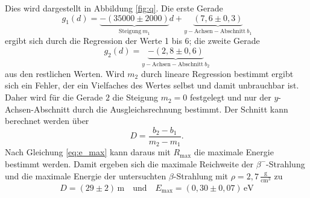 Dies wird dargestellt in Abbildung \ref{fig:q}.
Die erste Gerade
\begin{equation}
g_1(d)=\underbrace{-(35000\pm2000)}_{\text{Steigung}\:m_1}d+\underbrace{(7,6\pm0,3)}_{y-\text{Achsen}-\text{Abschnitt}\:b_1}
\end{equation}
ergibt sich durch die Regression der Werte 1 bis 6; die zweite Gerade
\begin{equation}
g_2(d)=\underbrace{-(2,8\pm0,6)}_{y-\text{Achsen}-\text{Abschnitt}\: b_2}
\end{equation}
aus den restlichen Werten. Wird $m_2$ durch lineare Regression bestimmt ergibt sich ein Fehler, der ein Vielfaches des Wertes selbst und damit unbrauchbar ist. Daher wird für die Gerade $2$ die Steigung $m_2=0$ festgelegt und nur der $y$-Achsen-Abschnitt durch die Ausgleichsrechnung bestimmt. 
Der Schnitt kann berechnet werden über 
\begin{equation}
D=\frac{b_2-b_1}{m_2-m_1}.
\end{equation}
Nach Gleichung \eqref{eq:e_max} kann daraus mit $R_\mathup{max}$ die maximale Energie bestimmt werden. Damit ergeben sich die maximale Reichweite der $\beta^-$-Strahlung und die maximale Energie der untersuchten $\beta$-Strahlung mit $\rho=2,7\,\frac{\si\gram}{\si{\centi}\si{\meter}^3}$ zu
\begin{align}
D=(29\pm2)\,\si\meter \quad\text{und}\quad E_\mathup{max}=(0,30\pm0,07)\,\mathup{e}\si\volt
\end{align}
